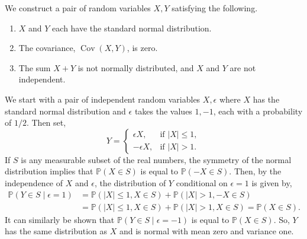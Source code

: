 \documentclass[12pt]{article}
\begin{document}
We construct a pair of random variables $X,Y$ satisfying the following.
\begin{enumerate}
\item $X$ and $Y$ each have the standard normal distribution.
\item The covariance, $\operatorname{Cov}(X,Y)$, is zero.
\item The sum $X+Y$ is not normally distributed, and $X$ and $Y$ are not independent.
\end{enumerate}
We start with a pair of independent random variables $X,\epsilon$ where $X$ has the standard normal distribution and $\epsilon$ takes the values $1,-1$, each with a probability of $1/2$.
Then set,
\begin{equation*}
Y=\left\{
\begin{array}{ll}
\epsilon X,&\textrm{if }|X|\le 1,\\
-\epsilon X,&\textrm{if }|X|>1.
\end{array}
\right.
\end{equation*}
If $S$ is any measurable subset of the real numbers, the symmetry of the normal distribution implies that $\mathbb{P}(X\in S)$ is equal to $\mathbb{P}(-X\in S)$. Then, by the independence of $X$ and $\epsilon$, the distribution of $Y$ conditional on $\epsilon=1$ is given by,
\begin{equation*}\begin{split}
\mathbb{P}(Y\in S\mid\epsilon=1) &= \mathbb{P}(|X|\le 1, X\in S) +\mathbb{P}(|X|>1,-X\in S)\\
&=\mathbb{P}(|X|\le 1,X\in S)+\mathbb{P}(|X|>1,X\in S)=\mathbb{P}(X\in S).
\end{split}\end{equation*}
It can similarly be shown that $\mathbb{P}(Y\in S\mid\epsilon=-1)$ is equal to $\mathbb{P}(X\in S)$.
So, $Y$ has the same distribution as $X$ and is normal with mean zero and variance one.
\end{document}

